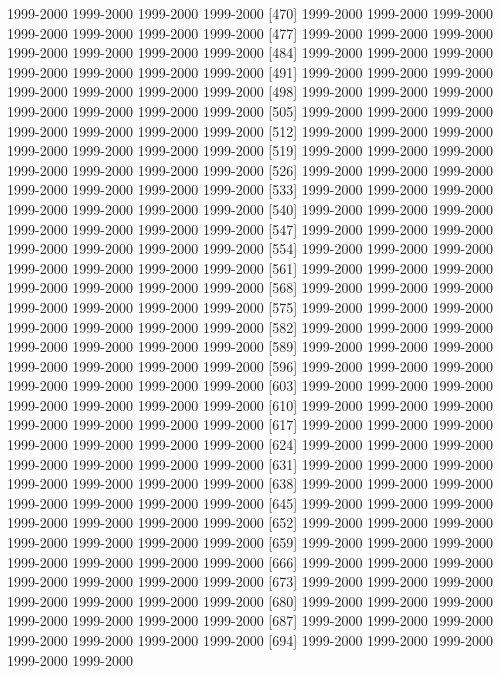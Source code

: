 \documentclass[
]{article}
\begin{document}
1999-2000 1999-2000 1999-2000 1999-2000 {[}470{]} 1999-2000 1999-2000
1999-2000 1999-2000 1999-2000 1999-2000 1999-2000 {[}477{]} 1999-2000
1999-2000 1999-2000 1999-2000 1999-2000 1999-2000 1999-2000 {[}484{]}
1999-2000 1999-2000 1999-2000 1999-2000 1999-2000 1999-2000 1999-2000
{[}491{]} 1999-2000 1999-2000 1999-2000 1999-2000 1999-2000 1999-2000
1999-2000 {[}498{]} 1999-2000 1999-2000 1999-2000 1999-2000 1999-2000
1999-2000 1999-2000 {[}505{]} 1999-2000 1999-2000 1999-2000 1999-2000
1999-2000 1999-2000 1999-2000 {[}512{]} 1999-2000 1999-2000 1999-2000
1999-2000 1999-2000 1999-2000 1999-2000 {[}519{]} 1999-2000 1999-2000
1999-2000 1999-2000 1999-2000 1999-2000 1999-2000 {[}526{]} 1999-2000
1999-2000 1999-2000 1999-2000 1999-2000 1999-2000 1999-2000 {[}533{]}
1999-2000 1999-2000 1999-2000 1999-2000 1999-2000 1999-2000 1999-2000
{[}540{]} 1999-2000 1999-2000 1999-2000 1999-2000 1999-2000 1999-2000
1999-2000 {[}547{]} 1999-2000 1999-2000 1999-2000 1999-2000 1999-2000
1999-2000 1999-2000 {[}554{]} 1999-2000 1999-2000 1999-2000 1999-2000
1999-2000 1999-2000 1999-2000 {[}561{]} 1999-2000 1999-2000 1999-2000
1999-2000 1999-2000 1999-2000 1999-2000 {[}568{]} 1999-2000 1999-2000
1999-2000 1999-2000 1999-2000 1999-2000 1999-2000 {[}575{]} 1999-2000
1999-2000 1999-2000 1999-2000 1999-2000 1999-2000 1999-2000 {[}582{]}
1999-2000 1999-2000 1999-2000 1999-2000 1999-2000 1999-2000 1999-2000
{[}589{]} 1999-2000 1999-2000 1999-2000 1999-2000 1999-2000 1999-2000
1999-2000 {[}596{]} 1999-2000 1999-2000 1999-2000 1999-2000 1999-2000
1999-2000 1999-2000 {[}603{]} 1999-2000 1999-2000 1999-2000 1999-2000
1999-2000 1999-2000 1999-2000 {[}610{]} 1999-2000 1999-2000 1999-2000
1999-2000 1999-2000 1999-2000 1999-2000 {[}617{]} 1999-2000 1999-2000
1999-2000 1999-2000 1999-2000 1999-2000 1999-2000 {[}624{]} 1999-2000
1999-2000 1999-2000 1999-2000 1999-2000 1999-2000 1999-2000 {[}631{]}
1999-2000 1999-2000 1999-2000 1999-2000 1999-2000 1999-2000 1999-2000
{[}638{]} 1999-2000 1999-2000 1999-2000 1999-2000 1999-2000 1999-2000
1999-2000 {[}645{]} 1999-2000 1999-2000 1999-2000 1999-2000 1999-2000
1999-2000 1999-2000 {[}652{]} 1999-2000 1999-2000 1999-2000 1999-2000
1999-2000 1999-2000 1999-2000 {[}659{]} 1999-2000 1999-2000 1999-2000
1999-2000 1999-2000 1999-2000 1999-2000 {[}666{]} 1999-2000 1999-2000
1999-2000 1999-2000 1999-2000 1999-2000 1999-2000 {[}673{]} 1999-2000
1999-2000 1999-2000 1999-2000 1999-2000 1999-2000 1999-2000 {[}680{]}
1999-2000 1999-2000 1999-2000 1999-2000 1999-2000 1999-2000 1999-2000
{[}687{]} 1999-2000 1999-2000 1999-2000 1999-2000 1999-2000 1999-2000
1999-2000 {[}694{]} 1999-2000 1999-2000 1999-2000 1999-2000 1999-2000
\end{document}
